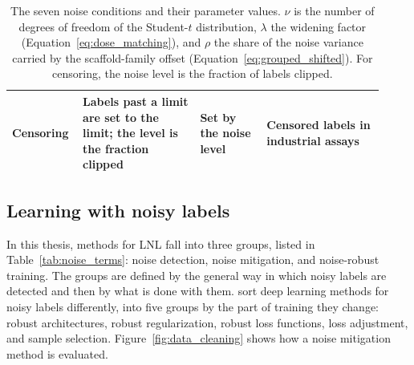 \begin{table}[htbp]
\begin{adjustbox}{max width=\textwidth,max totalheight=0.78\textheight}
\begin{tabular}{@{}P{0.15\linewidth}P{0.30\linewidth}P{0.17\linewidth}P{0.30\linewidth}@{}}
Censoring & Labels past a limit are set to the limit; the level is the fraction clipped & Set by the noise level & Censored labels in industrial assays \citep{Svensson2025} \\
\bottomrule
\end{tabular}
\end{adjustbox}
\caption[The seven noise conditions and their parameters.]{The seven noise conditions and their parameter values. $\nu$ is the number of degrees of freedom of the Student-$t$ distribution, $\lambda$ the widening factor (Equation~\ref{eq:dose_matching}), and $\rho$ the share of the noise variance carried by the scaffold-family offset (Equation~\ref{eq:grouped_shifted}). For censoring, the noise level is the fraction of labels clipped.}
\label{tab:noise_conditions}
\end{table}

\subsection{Learning with noisy labels}\label{sec:lnl_background}

In this thesis, methods for LNL fall into three groups, listed in Table~\ref{tab:noise_terms}: noise detection, noise mitigation, and noise-robust training. The groups are defined by the general way in which noisy labels are detected and then by what is done with them. \citet{Song2022} sort deep learning methods for noisy labels differently, into five groups by the part of training they change: robust architectures, robust regularization, robust loss functions, loss adjustment, and sample selection. Figure~\ref{fig:data_cleaning} shows how a noise mitigation method is evaluated.

